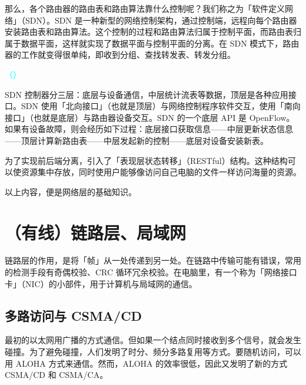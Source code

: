 \documentclass[UTF8]{ctexart}
\newcommand\Concept[1]{\textcolor{cyan!70!black}{#1}}
\begin{document}
那么，各个路由器的路由表和路由算法靠什么控制呢？我们称之为\Concept{「软件定义网络」（SDN）}。SDN 是一种新型的网络控制架构，通过控制端，远程向每个路由器安装路由表和路由算法。这个控制的过程和路由算法归属于控制平面，而路由表归属于数据平面，这样就实现了数据平面与控制平面的分离。在 SDN 模式下，路由器的工作就变得很单纯，即收到分组、查找转发表、转发分组。

\textcolor{cyan}{（）}

SDN 控制器分三层：底层与设备通信，中层统计流表等数据，顶层是各种应用接口。SDN 使用「北向接口」（也就是顶层）与网络控制程序软件交互，使用「南向接口」（也就是底层）与路由器设备交互。SDN 的一个底层 API 是 OpenFlow。如果有设备故障，则会经历如下过程：底层接口获取信息——中层更新状态信息——顶层计算新路由表——中层发起新的控制——底层对设备安装新表。



为了实现前后端分离，引入了「表现层状态转移」（RESTful）结构。这种结构可以使资源集中存放，同时使用户能够像访问自己电脑的文件一样访问海量的资源。

以上内容，便是网络层的基础知识。

\section{（有线）链路层、局域网}
链路层的作用，是将「帧」从一处传递到另一处。在链路中传输可能有错误，常用的检测手段有奇偶校验、CRC 循环冗余校验。在电脑里，有一个称为「网络接口卡」（NIC）的小部件，用于计算机与局域网的通信。

\subsection{多路访问与 CSMA/CD}
最初的以太网用广播的方式通信。但如果一个结点同时接收到多个信号，就会发生碰撞。为了避免碰撞，人们发明了时分、频分多路复用等方式。要随机访问，可以用 ALOHA 方式来通信。然而，ALOHA 的效率很低，因此又发明了新的方式 CSMA/CD 和 CSMA/CA。
\end{document}
